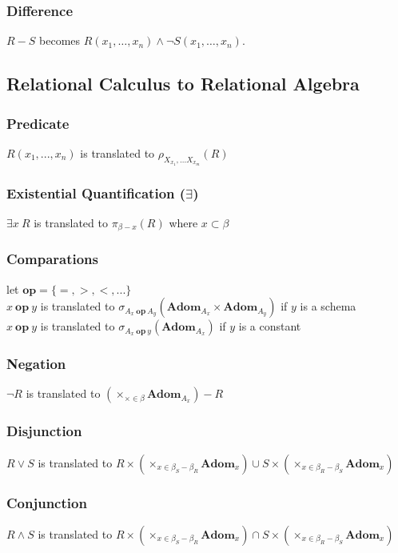 \documentclass{article}
\begin{document}
\subsubsection*{Difference}
$R - S$ becomes $R(x_1, \ldots, x_n) \wedge \neg S(x_1, \ldots, x_n)$.

\subsection{Relational Calculus to Relational Algebra}
\subsubsection*{Predicate}
$R(x_1, ... ,x_n)$ is translated to $\rho_{X_{x_1}, ... X_{x_m}}(R)$

\subsubsection*{Existential Quantification ($\exists$)}
$\exists x \: R$ is translated to $\pi_{\beta - x}(R)$ where $x \subset \beta$

\subsubsection*{Comparations}
let $\mathbf{op} = \{=,>,<,...\}$\\
$x \:\mathbf{op}\: y$ is translated to $\sigma_{A_x \:\mathbf{op}\: A_y} (\mathbf{Adom}_{A_x}\times\mathbf{Adom}_{A_y})$ if $y$ is a schema\\
$x \:\mathbf{op}\: y$ is translated to $\sigma_{A_x \:\mathbf{op}\: y} (\mathbf{Adom}_{A_x})$ if $y$ is a constant

\subsubsection*{Negation}
$\neg R$ is translated to $(\times_{\times \in \beta} \mathbf{Adom}_{A_x}) - R$

\subsubsection*{Disjunction}
$R \vee S$ is translated to $R \times (\times_{x \in \beta_S - \beta_R} \textbf{Adom}_x) \cup S \times (\times_{x \in \beta_R - \beta_S} \textbf{Adom}_x)$

\subsubsection*{Conjunction}
$R \wedge S$ is translated to $R \times (\times_{x \in \beta_S - \beta_R} \textbf{Adom}_x) \cap S \times (\times_{x \in \beta_R - \beta_S} \textbf{Adom}_x)$
\end{document}
